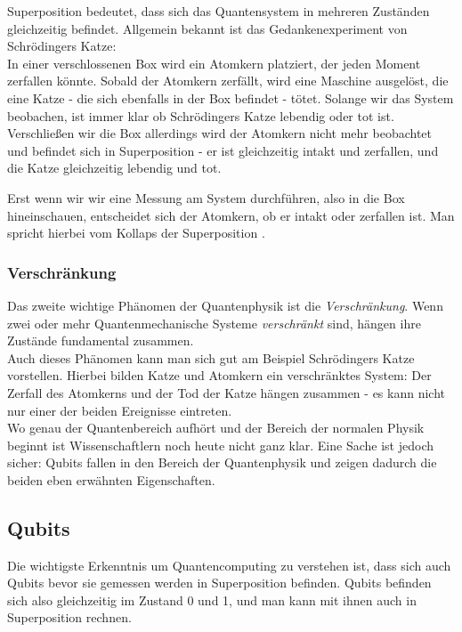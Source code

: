 \documentclass[12pt]{IEEEtran}
\begin{document}
Superposition bedeutet, dass sich das Quantensystem in mehreren Zuständen gleichzeitig befindet. Allgemein bekannt ist das Gedankenexperiment von Schrödingers Katze: \\
In einer verschlossenen Box wird ein Atomkern platziert, der jeden Moment zerfallen könnte. Sobald der Atomkern zerfällt, wird eine Maschine ausgelöst, die eine Katze - die sich ebenfalls in der Box befindet - tötet. Solange wir das System beobachen, ist immer klar ob Schrödingers Katze lebendig oder tot ist. Verschließen wir die Box allerdings wird der Atomkern nicht mehr beobachtet und befindet sich in Superposition - er ist gleichzeitig intakt und zerfallen, und die Katze gleichzeitig lebendig und tot. \cite{ImgSchrodinger}

Erst wenn wir wir eine Messung am System durchführen, also in die Box hineinschauen, entscheidet sich der Atomkern, ob er intakt oder zerfallen ist. Man spricht hierbei vom Kollaps der Superposition \cite{KollapsWiki}.

\subsubsection{Verschränkung}

Das zweite wichtige Phänomen der Quantenphysik ist die \textit{Verschränkung}. Wenn zwei oder mehr Quantenmechanische Systeme \textit{verschränkt} sind, hängen ihre Zustände fundamental zusammen. \cite{mavroeidis2018impact} \\
Auch dieses Phänomen kann man sich gut am Beispiel Schrödingers Katze vorstellen. Hierbei bilden Katze und Atomkern ein verschränktes System: Der Zerfall des Atomkerns und der Tod der Katze hängen zusammen - es kann nicht nur einer der beiden Ereignisse eintreten. \\

Wo genau der Quantenbereich aufhört und der Bereich der normalen Physik beginnt ist Wissenschaftlern noch heute nicht ganz klar. Eine Sache ist jedoch sicher: Qubits fallen in den Bereich der Quantenphysik und zeigen dadurch die beiden eben erwähnten Eigenschaften.

\subsection{Qubits}

Die wichtigste Erkenntnis um Quantencomputing zu verstehen ist, dass sich auch Qubits bevor sie gemessen werden in Superposition befinden. Qubits befinden sich also gleichzeitig im Zustand 0 und 1, und man kann mit ihnen auch in Superposition rechnen. \cite{mavroeidis2018impact} \\
\end{document}
